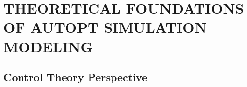 \section{THEORETICAL FOUNDATIONS OF AUTOPT SIMULATION MODELING}
\subsection{Control Theory Perspective}



